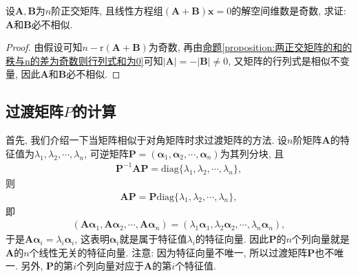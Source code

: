 \documentclass[../../main.tex]{subfiles}%
\begin{document}
\begin{example}
设\(\boldsymbol{A},\boldsymbol{B}\)为\(n\)阶正交矩阵, 且线性方程组\((\boldsymbol{A}+\boldsymbol{B})\boldsymbol{x} = 0\)的解空间维数是奇数, 求证: \(\boldsymbol{A}\)和\(\boldsymbol{B}\)必不相似.
\end{example}
\begin{proof}
由假设可知\(n - \mathrm{r}(\boldsymbol{A}+\boldsymbol{B})\)为奇数, 再由\hyperref[proposition:两正交矩阵的和的秩与n的差为奇数则行列式和为0]{命题\ref{proposition:两正交矩阵的和的秩与n的差为奇数则行列式和为0}}可知\(\vert\boldsymbol{A}\vert = -\vert\boldsymbol{B}\vert\neq 0\), 又矩阵的行列式是相似不变量, 因此\(\boldsymbol{A}\)和\(\boldsymbol{B}\)必不相似. 
\end{proof}

\subsection{过渡矩阵$P$的计算}

首先, 我们介绍一下当矩阵相似于对角矩阵时求过渡矩阵的方法. 设\(n\)阶矩阵\(\boldsymbol{A}\)的特征值为\(\lambda_{1},\lambda_{2},\cdots,\lambda_{n}\), 可逆矩阵\(\boldsymbol{P}=(\boldsymbol{\alpha}_{1},\boldsymbol{\alpha}_{2},\cdots,\boldsymbol{\alpha}_{n})\)为其列分块, 且
\begin{align*}
\boldsymbol{P}^{-1}\boldsymbol{AP}=\mathrm{diag}\{\lambda_{1},\lambda_{2},\cdots,\lambda_{n}\},
\end{align*}
则
\begin{align*}
\boldsymbol{AP}=\boldsymbol{P}\mathrm{diag}\{\lambda_{1},\lambda_{2},\cdots,\lambda_{n}\},
\end{align*}
即
\begin{align*}
(\boldsymbol{A}\boldsymbol{\alpha}_{1},\boldsymbol{A}\boldsymbol{\alpha}_{2},\cdots,\boldsymbol{A}\boldsymbol{\alpha}_{n})=(\lambda_{1}\boldsymbol{\alpha}_{1},\lambda_{2}\boldsymbol{\alpha}_{2},\cdots,\lambda_{n}\boldsymbol{\alpha}_{n}),
\end{align*}
于是\(\boldsymbol{A}\boldsymbol{\alpha}_{i}=\lambda_{i}\boldsymbol{\alpha}_{i}\), 这表明\(\boldsymbol{\alpha}_{i}\)就是属于特征值\(\lambda_{i}\)的特征向量. 因此\(\boldsymbol{P}\)的\(n\)个列向量就是\(\boldsymbol{A}\)的\(n\)个线性无关的特征向量. 注意: 因为特征向量不唯一, 所以过渡矩阵\(\boldsymbol{P}\)也不唯一. 另外, \(\boldsymbol{P}\)的第\(i\)个列向量对应于\(\boldsymbol{A}\)的第\(i\)个特征值. 
\end{document}

